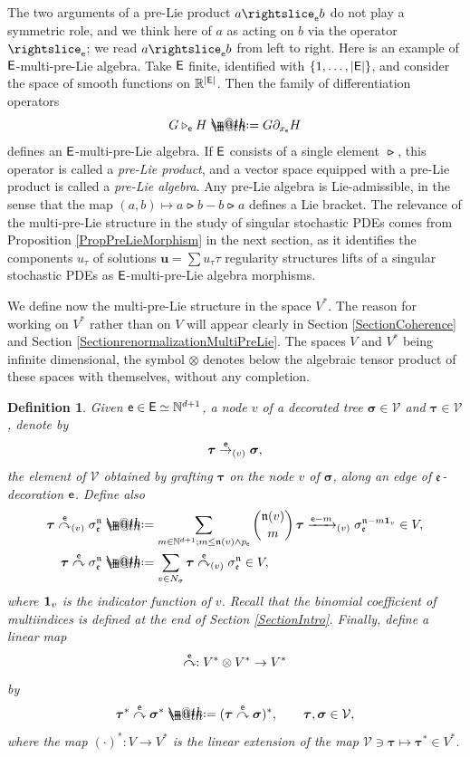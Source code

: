 \documentclass[10pt, reqno]{amsart}
\makeatletter
\numberwithin{subsection}{section}
\numberwithin{subsubsection}{subsection}
\numberwithin{equation}{section} %
\theoremstyle{mystyle}
\theoremstyle{mystyle2}
\newtheorem*{defn*} {Definition}
\theoremstyle{mystyle3}
\newcommand{\bsu}{\boldsymbol{u}}
\newcommand{\bstau}{\boldsymbol{\tau}}
\newcommand{\bssigma}{\boldsymbol{\sigma}}
\newcommand{\graftingatv}{\overset{\sf e}{\curvearrowright}_{(v)}}
\newcommand{\grafting}{\overset{\sf e}{\curvearrowright}}
\newcommand\bbN{\mathbb{N}}
\newcommand\bbR{\mathbb{R}}
\newcommand\mcV{\mathcal V}
\newcommand*{\defeq}{\mathrel{\rlap{%
                     \raisebox{0.3ex}{$\m@th\cdot$}}%
                     \raisebox{-0.3ex}{$\m@th\cdot$}}%
                     =}
\makeatother
\begin{document}
\medskip

The two arguments of a pre-Lie product $a\rightslice_{\sf{e}}b$ do not play a symmetric role, and we think here of $a$ as acting on $b$ via the operator $\rightslice_{\sf{e}}$; we read $a\rightslice_{\sf{e}}b$ from left 
to right. Here is an example of $\sf E$-multi-pre-Lie algebra. Take $\sf E$ finite, identified with $\{1,\dots,\vert \sf E\vert\}$, and consider the space of smooth functions on $\bbR^{\vert \sf E\vert}$. Then the family of differentiation operators
$$
G \triangleright_{\sf e} H \defeq  G\partial_{x_{\sf e}}H
$$
defines an $\sf E$-multi-pre-Lie algebra. If $\sf E$ consists of a single 
element $\rightslice$, this operator is called a {\it pre-Lie product}, and a vector space equipped with a pre-Lie product is called a {\it pre-Lie algebra}. Any pre-Lie algebra is Lie-admissible, in the sense that the map $(a,b)\mapsto a\rightslice b - b\rightslice a$ defines a Lie bracket. 
The relevance of the multi-pre-Lie structure in the study of singular stochastic PDEs comes from Proposition \ref{PropPreLieMorphism} in the next section, as it identifies the components $u_\tau$ of solutions $\bsu=\sum u_\tau\tau$ regularity structures lifts of a singular stochastic PDEs as $\sf E$-multi-pre-Lie algebra morphisms.

\medskip

We define now the multi-pre-Lie structure in the space $V^*$. The reason for working on $V^*$ rather than on $V$ will appear clearly in Section \ref{SectionCoherence} and Section \ref{SectionrenormalizationMultiPreLie}. The spaces $V$ and $V^*$ being infinite dimensional, the symbol $\otimes$ denotes below the algebraic tensor product of these spaces with themselves, without any completion. 

\medskip

\begin{defn*}
Given ${\sf e}\in{\sf E}\simeq\bbN^{d+1}$, a node $v$ of a decorated tree $\bssigma\in \mcV$ and $\bstau\in \mcV$, denote by 
$$
\bstau\overset{\sf e}{\rightarrow}_{(v)}\bssigma,
$$
the element of $\mcV$ obtained by grafting $\bstau$ on the node $v$ of $\bssigma$, along an edge of $\frak{e}$-decoration ${\sf e}$.
Define also
\begin{align*}
\bstau\graftingatv\sigma_{\frak{e}}^{\frak{n}}
&\defeq  \sum_{m\in\bbN^{d+1}; m\le \frak{n}(v)\wedge p_{\sf e}}\binom{\frak{n}(v)}{m}\,
\bstau\xrightarrow{{\sf e}-m}_{(v)}\sigma_{\frak{e}}^{\frak{n}-m{\bf1}_v}
\in V,\\
\bstau\grafting\sigma_{\frak{e}}^{\frak{n}}
&\defeq \sum_{v\in N_\sigma}\bstau\graftingatv\sigma_{\frak{e}}^{\frak{n}}\in V,
\end{align*}
where ${\bf1}_v$ is the indicator function of $v$. Recall that the binomial coefficient of multiindices is defined at the end of Section \ref{SectionIntro}. Finally, define a linear map 
$$
\grafting : V^*\otimes V^*\rightarrow V^*
$$ 
by
$$
\bstau^*\grafting\bssigma^* \defeq  (\bstau\grafting\bssigma)^*,\qquad
\bstau,\bssigma\in\mcV,
$$
where the map $(\cdot)^*:V\to V^*$ is the linear extension of the map $\mcV\ni\bstau\mapsto\bstau^*\in V^*$.
\end{defn*}
\end{document}
